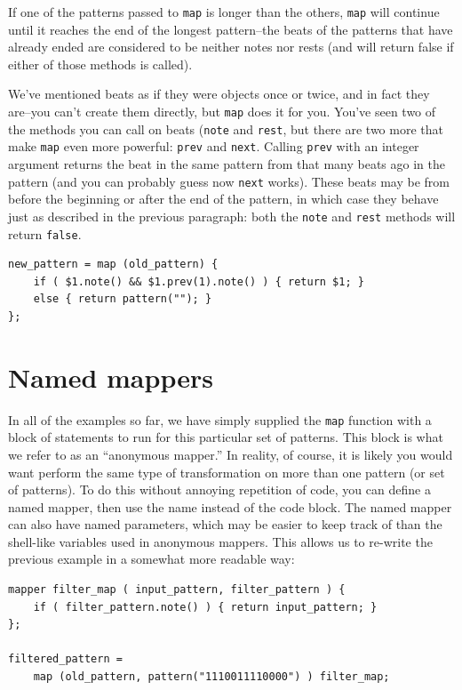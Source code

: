If one of the patterns passed to {\tt map} is longer than the others, {\tt map} will continue until it reaches the end of the longest pattern--the beats of the patterns that have already ended are considered to be neither notes nor rests (and will return false if either of those methods is called).

We've mentioned beats as if they were objects once or twice, and in fact they are--you can't create them directly, but {\tt map} does it for you.  You've seen two of the methods you can call on beats ({\tt note} and {\tt rest}, but there are two more that make {\tt map} even more powerful:  {\tt prev} and {\tt next}.
Calling {\tt prev} with an integer argument returns the beat in the same pattern from that many beats ago in the pattern (and you can probably guess now {\tt next} works).  These beats may be from before the beginning or after the end of the pattern, in which case they behave just as described in the previous paragraph: both the {\tt note} and {\tt rest} methods will return {\tt false}.

\begin{lstlisting}
new_pattern = map (old_pattern) {
	if ( $1.note() && $1.prev(1).note() ) { return $1; }
	else { return pattern(""); }
};
\end{lstlisting}

\section{Named mappers}

In all of the examples so far, we have simply supplied the {\tt map} function with a block of statements to run for this particular set of patterns.  This block is what we refer to as an ``anonymous mapper.''  In reality, of course, it is likely you would want perform the same type of transformation on more than one pattern (or set of patterns).  To do this without annoying repetition of code, you can define a named mapper, then use the name instead of the code block.  The named mapper can also have named parameters, which may be easier to keep track of than the shell-like variables used in anonymous mappers.  This allows us to re-write the previous example in a somewhat more readable way:
\begin{lstlisting}
mapper filter_map ( input_pattern, filter_pattern ) {
	if ( filter_pattern.note() ) { return input_pattern; }
};

filtered_pattern =
	map (old_pattern, pattern("1110011110000") ) filter_map;
\end{lstlisting}



